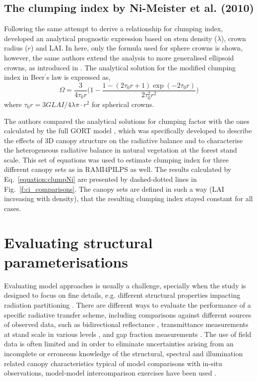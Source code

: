 \subsection{The clumping index by Ni-Meister et al. (2010)}
Following the same attempt to derive a relationship for clumping index, \citet{Ni-Meister2010} developed an analytical prognostic expression based on stem density ($\lambda$), crown radius ($r$) and LAI. In here, only the formula used for sphere crowns is shown, however, the same authors extend the analysis to more generalised ellipsoid crowns, as introduced in \citet{Li1988}. The analytical solution for the modified clumping index in Beer$^{\prime}$s law is expressed as, 
\begin{equation}
\Omega = \frac{3}{4\tau_0r}\Big(1 - \frac{1 - (2\tau_0r + 1)\exp(-2\tau_0r)}{2\tau_0^2r^2}\Big)
\label{equation:clumpNi}
\end{equation}
\noindent where $\tau_0r = 3 G LAI/ 4 \lambda \pi \cdot r^2$ for spherical crowns. 

The authors compared the analytical solutions for clumping factor with the ones calculated by the full GORT model \citep{Li1995}, which was specifically developed to describe the effects of 3D canopy structure on the radiative balance and to characterise the heterogeneous radiative balance in natural vegetation at the forest stand scale. This set of equations was used to estimate clumping index for three different canopy sets as in RAMI4PILPS as well. The results calculated by Eq.~\ref{equation:clumpNi} are presented by dashed-dotted lines in Fig.~\ref{f:ci_comparisons}. The canopy sets are defined in such a way (LAI increasing with density), that the resulting clumping index stayed constant for all cases. 

\section{Evaluating structural parameterisations}
Evaluating model approaches is usually a challenge, specially when the study is designed to focus on fine details, e.g. different structural properties impacting radiation partitioning \citep{Kobayashi2012}. There are different ways to evaluate the performance of a specific radiative transfer scheme, including comparisons against different sources of observed data, such as bidirectional reflectance \citep{North1996,Malenovsky2008}, transmittance measurements at stand scale in various levels \citep{Norman1983,Wang1990,Tournebize1995,Law2001a,Sinoquet2001}, and gap fraction measurements \citep{Cescatti1997,Kucharik1999,Yang2010}. The use of field data is often limited and in order to eliminate uncertainties arising from an incomplete or erroneous knowledge of the structural, spectral and illumination related canopy characteristics typical of model comparisons with in-situ observations,  model-model intercomparison exercises have been used \citep{Pinty2001,Pinty2004,Widlowski2007,Widlowski2011,Widlowski2013}.

